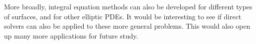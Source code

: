 \documentclass{sfuthesis}
\begin{document}
More broadly, integral equation methods can also be developed for different types of surfaces, and for other elliptic PDEs. It would be interesting to see if direct solvers can also be applied to these more general problems. This would also open up many more applications for future study. 
\clearpage

%
%
%
%
%

\backmatter%
	
	
\end{document}
